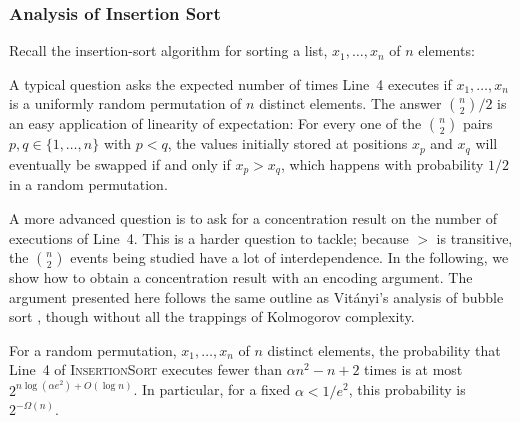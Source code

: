 \documentclass{patmorin}
\begin{document}
\subsubsection{Analysis of Insertion Sort}

Recall the insertion-sort algorithm for sorting a list,
$x_1,\ldots,x_n$ of $n$ elements:

\begin{algorithmic}[1]
     \ENDWHILE
  \ENDFOR
\end{algorithmic}

A typical question asks the expected number of times Line~4 executes
if $x_1,\ldots,x_n$ is a uniformly random permutation of $n$ distinct
elements.  The answer $\binom{n}{2}/2$ is an easy application of
linearity of expectation: For every one of the $\binom{n}{2}$ pairs
$p,q\in\{1,\ldots,n\}$ with $p<q$, the values initially stored at
positions $x_p$ and $x_q$ will eventually be swapped if and only if
$x_p > x_q$, which happens with probability $1/2$ in a random
permutation.

A more advanced question is to ask for a concentration result on the
number of executions of Line~4. This is a harder question to tackle;
because $>$ is transitive, the $\binom{n}{2}$ events being studied
have a lot of interdependence. In the following, we show how to obtain
a concentration result with an encoding argument.  The argument
presented here follows the same outline as Vit\'{a}nyi's analysis of
bubble sort \cite{vitanyi:analysis}, though without all the trappings
of Kolmogorov complexity.

\begin{thm}
  For a random permutation, $x_1,\ldots,x_n$ of $n$ distinct elements,
  the probability that Line~4 of \textsc{InsertionSort} executes fewer
  than $\alpha n^2 - n + 2$ times is at most
  $2^{n\log(\alpha e^2)+O(\log n)}$.  In particular, for a fixed
  $\alpha < 1/e^2$, this probability is $2^{-\Omega(n)}$.
\end{thm}
\end{document}
